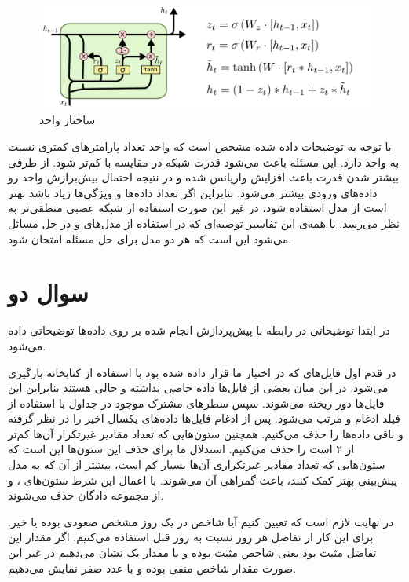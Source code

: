 \documentclass[12pt, a4paper]{book}
\begin{document}
\begin{figure}[h]
    \centering
    \includegraphics[width=0.8\linewidth]{images/q1/gru.png}
    \caption{ساختار واحد }
    \label{gru_architecture}
\end{figure}

با توجه به توضیحات داده شده مشخص است که واحد  تعداد پارامتر‌های کمتری نسبت به واحد  دارد.
این مسئله باعث می‌شود قدرت شبکه  در مقایسه با  کم‌تر شود. از طرفی بیشتر شدن قدرت باعث افزایش
واریانس شده و در نتیجه احتمال بیش‌برازش واحد  رو داده‌های ورودی بیشتر می‌شود. بنابراین اگر تعداد داده‌ها
و ویژگی‌ها زیاد باشد بهتر است از مدل  استفاده شود، در غیر این صورت استفاده از شبکه عصبی  منطقی‌تر
به نظر می‌رسد. با همه‌ی این تفاسیر توصیه‌ای که در استفاده از مدل‌های  و  در حل مسائل می‌شود این
است که هر دو مدل برای حل مسئله امتحان شود.

\section*{سوال دو}

در ابتدا توضیحاتی در رابطه با پیش‌پردازش انجام شده بر روی داده‌ها توضیحاتی داده می‌شود.

در قدم اول فایل‌های  که در اختیار ما قرار داده شده بود با استفاده از کتابخانه  بارگیری
می‌شود. در این میان بعضی از فایل‌ها داده خاصی نداشته و خالی هستند بنابراین این فایل‌ها دور ریخته می‌شوند.
سپس سطر‌های مشترک موجود در جداول با استفاده از فیلد  ادغام و مرتب می‌شود. پس از ادغام فایل‌‌ها
داده‌های یکسال اخیر را در نظر گرفته و باقی داده‌ها را حذف می‌کنیم. همچنین ستون‌هایی که تعداد مقادیر غیرتکرار آن‌ها
کم‌تر از ۲ است را حذف می‌کنیم. استدلال ما برای حذف این ستون‌ها این است که ستون‌هایی که تعداد مقادیر غیرتکراری آن‌ها
بسیار کم است، بیشتر از آن که به مدل پیش‌بینی بهتر کمک کنند، باعث گمراهی آن می‌شوند. با اعمال این شرط ستون‌های
،  و  از مجموعه دادگان حذف می‌شوند.

در نهایت لازم است که تعیین کنیم آیا شاخص در یک روز مشخص صعودی بوده یا خیر. برای این کار از تفاضل 
هر روز نسبت به روز قبل استفاده می‌کنیم. اگر مقدار این تفاضل مثبت بود یعنی شاخص مثبت بوده و با مقدار
یک نشان می‌دهیم در غیر این صورت مقدار شاخص منفی بوده و با عدد صفر نمایش می‌دهیم.
\end{document}
